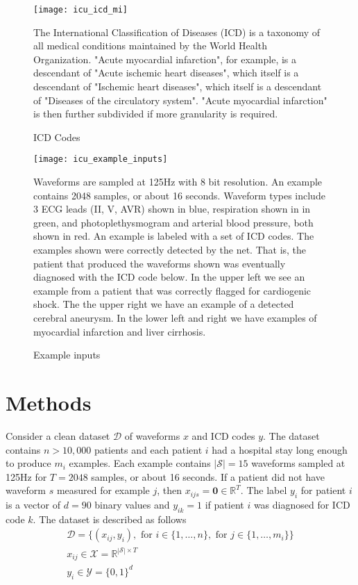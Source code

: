 \begin{figure}
\texttt{[image: icu\_icd\_mi]}
\caption{ICD Codes}
\vspace{12px}
The International Classification of Diseases (ICD) is a taxonomy of all medical conditions maintained by the World Health Organization.  "Acute myocardial infarction", for example, is a descendant of "Acute ischemic heart diseases", which itself is a descendant of "Ischemic heart diseases", which itself is a descendant of "Diseases of the circulatory system".  "Acute myocardial infarction" is then further subdivided if more granularity is required.
\label{fig:icu_icd_mi}
\end{figure}
    
\begin{figure}
\texttt{[image: icu\_example\_inputs]}
\caption{Example inputs}
\vspace{12px}
Waveforms are sampled at 125Hz with 8 bit resolution.  An example contains 2048 samples, or about 16 seconds.  Waveform types include 3 ECG leads (II, V, AVR) shown in blue, respiration shown in in green, and photoplethysmogram and arterial blood pressure, both shown in red.  An example is labeled with a set of ICD codes.  The examples shown were correctly detected by the net.  That is, the patient that produced the waveforms shown was eventually diagnosed with the ICD code below.  In the upper left we see an example from a patient that was correctly flagged for cardiogenic shock.  The the upper right we have an example of a detected cerebral aneurysm.  In the lower left and right we have examples of myocardial infarction and liver cirrhosis.
\label{fig:icu_example_waveforms}
\end{figure}

\pagebreak
\section{Methods}

Consider a clean dataset $\mathcal{D}$ of waveforms $x$ and ICD codes $y$.  The dataset contains $n > 10,000$ patients and each patient $i$ had a hospital stay long enough to produce $m_i$ examples.  Each example contains $|\mathcal{S}|=15$ waveforms sampled at 125Hz for $T = 2048$ samples, or about 16 seconds.  If a patient did not have waveform $s$ measured for example $j$, then $x_{ijs} = \mathbf{0} \in \mathbb{R}^T$.  The label $y_i$ for patient $i$ is a vector of $d=90$ binary values and $y_{ik} = 1$ if patient $i$ was diagnosed for ICD code $k$.  The dataset is described as follows
\begin{gather}
    \mathcal{D} = \{
        (x_{ij}, y_i),
        \text{ for } i \in \{ 1, \dots, n \},
        \text{ for } j \in \{ 1, \dots, m_i \}
    \} \\
    x_{ij} \in \mathcal{X} = \mathbb{R}^{|\mathcal{S}| \times T} \\
    y_i \in \mathcal{Y} = \{0, 1\}^d
\end{gather}

